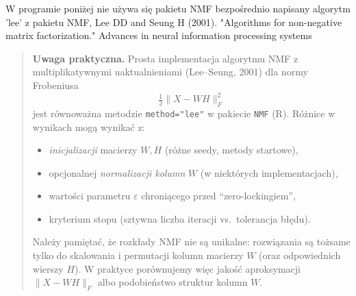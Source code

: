 \documentclass[12pt]{article}
\begin{document}
W programie poniżej nie używa się  pakietu NMF bezpośrednio napisany algorytm 'lee' z pakietu NMF, Lee DD and Seung H (2001). "Algorithms for non-negative matrix factorization." Advances in neural information processing systems

\begin{quote}
\textbf{Uwaga praktyczna.}  
Prosta implementacja algorytmu NMF z multiplikatywnymi uaktualnieniami
(Lee--Seung, 2001) dla normy Frobeniusa
\[
  \tfrac{1}{2}\|X - WH\|_F^2
\]
jest równoważna metodzie \texttt{method="lee"} w pakiecie \texttt{NMF} (R).
Różnice w wynikach mogą wynikać z:
\begin{itemize}[label=$\triangleright$]
  \item \emph{inicjalizacji} macierzy $W,H$ (różne seedy, metody startowe),
  \item opcjonalnej \emph{normalizacji kolumn} $W$ (w niektórych implementacjach),
  \item wartości parametru $\varepsilon$ chroniącego przed ``zero-lockingiem'',
  \item kryterium stopu (sztywna liczba iteracji vs.~tolerancja błędu).
\end{itemize}
Należy pamiętać, że rozkłady NMF nie są unikalne: rozwiązania są tożsame
tylko do skalowania i permutacji kolumn macierzy $W$ (oraz odpowiednich
wierszy $H$). W praktyce porównujemy więc jakość aproksymacji
$\|X-WH\|_F$ albo podobieństwo struktur kolumn $W$.
\end{quote}
\end{document}

